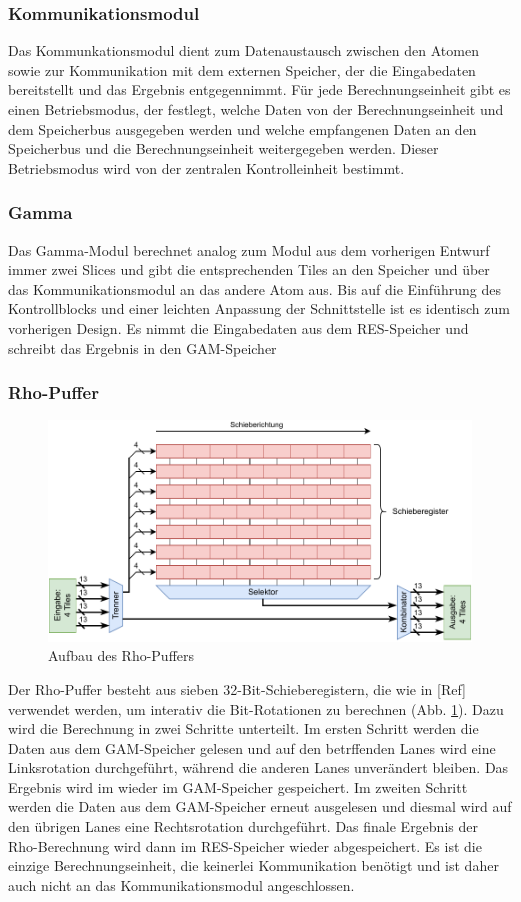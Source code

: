 \subsubsection{Kommunikationsmodul}
Das Kommunkationsmodul dient zum Datenaustausch zwischen den Atomen sowie zur Kommunikation mit dem externen Speicher, der die Eingabedaten bereitstellt und das Ergebnis entgegennimmt.
Für jede Berechnungseinheit gibt es einen Betriebsmodus, der festlegt, welche Daten von der Berechnungseinheit und dem Speicherbus ausgegeben werden und welche empfangenen Daten an den Speicherbus und die Berechnungseinheit
weitergegeben werden. Dieser Betriebsmodus wird von der zentralen Kontrolleinheit bestimmt.

\subsubsection{Gamma}
Das Gamma-Modul berechnet analog zum Modul aus dem vorherigen Entwurf immer zwei Slices und gibt die entsprechenden Tiles an den Speicher und über das Kommunikationsmodul an das andere Atom aus.
Bis auf die Einführung des Kontrollblocks und einer leichten Anpassung der Schnittstelle ist es identisch zum vorherigen Design. Es nimmt die Eingabedaten aus dem RES-Speicher und schreibt das Ergebnis in den GAM-Speicher

\subsubsection{Rho-Puffer}
\begin{figure}
	\center
	\includegraphics{images/Rho-Aufbau.pdf}
	\caption{Aufbau des Rho-Puffers}
	\label{fig:rho_aufbau_iteration_3}
\end{figure}
Der Rho-Puffer besteht aus sieben 32-Bit-Schieberegistern, die wie in [Ref] verwendet werden, um interativ die Bit-Rotationen zu berechnen (Abb. \ref{fig:rho_aufbau_iteration_3}).
Dazu wird die Berechnung in zwei Schritte unterteilt. Im ersten Schritt werden die Daten aus dem GAM-Speicher gelesen und auf den betrffenden Lanes wird eine Linksrotation durchgeführt, während die anderen Lanes unverändert bleiben.
Das Ergebnis wird im wieder im GAM-Speicher gespeichert. Im zweiten Schritt werden die Daten aus dem GAM-Speicher erneut ausgelesen und diesmal wird auf den übrigen Lanes eine Rechtsrotation durchgeführt. Das finale Ergebnis der Rho-Berechnung
wird dann im RES-Speicher wieder abgespeichert. Es ist die einzige Berechnungseinheit, die keinerlei Kommunikation benötigt und ist daher auch nicht an das Kommunikationsmodul angeschlossen.

